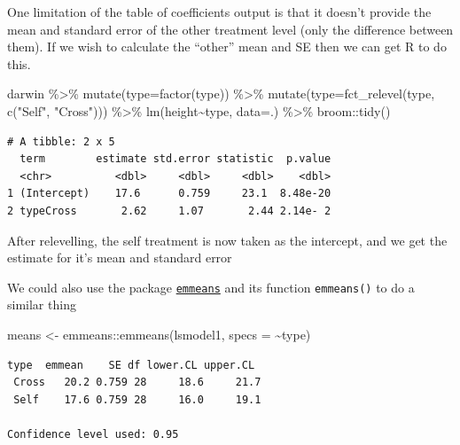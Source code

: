\documentclass[
]{book}
\newenvironment{Shaded}{\begin{snugshade}}{\end{snugshade}}
\newcommand{\AttributeTok}[1]{\textcolor[rgb]{0.77,0.63,0.00}{#1}}
\newcommand{\FunctionTok}[1]{\textcolor[rgb]{0.00,0.00,0.00}{#1}}
\newcommand{\NormalTok}[1]{#1}
\newcommand{\OtherTok}[1]{\textcolor[rgb]{0.56,0.35,0.01}{#1}}
\newcommand{\SpecialCharTok}[1]{\textcolor[rgb]{0.00,0.00,0.00}{#1}}
\newcommand{\StringTok}[1]{\textcolor[rgb]{0.31,0.60,0.02}{#1}}
\begin{document}
One limitation of the table of coefficients output is that it doesn't provide the mean and standard error of the other treatment level (only the difference between them). If we wish to calculate the ``other'' mean and SE then we can get R to do this.

\begin{Shaded}
\begin{Highlighting}[]
\NormalTok{darwin }\SpecialCharTok{\%\textgreater{}\%} 
  \FunctionTok{mutate}\NormalTok{(}\AttributeTok{type=}\FunctionTok{factor}\NormalTok{(type)) }\SpecialCharTok{\%\textgreater{}\%} 
  \FunctionTok{mutate}\NormalTok{(}\AttributeTok{type=}\FunctionTok{fct\_relevel}\NormalTok{(type, }\FunctionTok{c}\NormalTok{(}\StringTok{"Self"}\NormalTok{, }\StringTok{"Cross"}\NormalTok{))) }\SpecialCharTok{\%\textgreater{}\%} 
  \FunctionTok{lm}\NormalTok{(height}\SpecialCharTok{\textasciitilde{}}\NormalTok{type, }\AttributeTok{data=}\NormalTok{.) }\SpecialCharTok{\%\textgreater{}\%} 
\NormalTok{  broom}\SpecialCharTok{::}\FunctionTok{tidy}\NormalTok{()}
\end{Highlighting}
\end{Shaded}

\begin{verbatim}
# A tibble: 2 x 5
  term        estimate std.error statistic  p.value
  <chr>          <dbl>     <dbl>     <dbl>    <dbl>
1 (Intercept)    17.6      0.759     23.1  8.48e-20
2 typeCross       2.62     1.07       2.44 2.14e- 2
\end{verbatim}

After relevelling, the self treatment is now taken as the intercept, and we get the estimate for it's mean and standard error

We could also use the package \href{https://aosmith.rbind.io/2019/03/25/getting-started-with-emmeans/}{\texttt{emmeans}} and its function \texttt{emmeans()} to do a similar thing

\begin{Shaded}
\begin{Highlighting}[]
\NormalTok{means }\OtherTok{\textless{}{-}}\NormalTok{ emmeans}\SpecialCharTok{::}\FunctionTok{emmeans}\NormalTok{(lsmodel1, }\AttributeTok{specs =} \SpecialCharTok{\textasciitilde{}}\NormalTok{type)}
\end{Highlighting}
\end{Shaded}

\begin{verbatim}
type  emmean    SE df lower.CL upper.CL
 Cross   20.2 0.759 28     18.6     21.7
 Self    17.6 0.759 28     16.0     19.1

Confidence level used: 0.95 
\end{verbatim}
\end{document}
